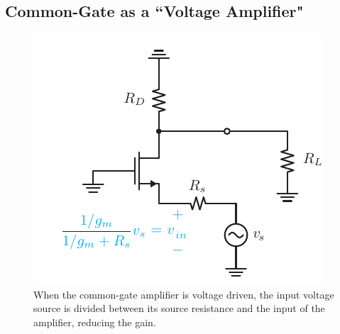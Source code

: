 \subsection{Common-Gate as a ``Voltage Amplifier"}
\begin{figure}[tb]
\begin{center}
\includegraphics[scale=1]{cgamp_vs_ac}
\end{center}
\caption{When the common-gate amplifier is voltage driven, the input voltage source is divided between its source resistance and the input of the amplifier, reducing the gain.}
\label{fig:cg_v_amp}
\end{figure}

